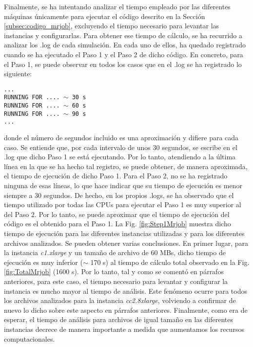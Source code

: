 \documentclass[10pt, spanish]{article}
\begin{document}
Finalmente, se ha intentando analizar el tiempo empleado por las diferentes máquinas únicamente para ejecutar el código descrito en la Sección \ref{subsec:codigo_mrjob}, excluyendo el tiempo necesario para levantar las instancias y configurarlas. Para obtener ese tiempo de cálculo, se ha recurrido a analizar los .log de cada simulación. En cada uno de ellos, ha quedado registrado cuando se ha ejecutado el Paso 1 y el Paso 2 de dicho código. En concreto, para el Paso 1, se puede observar en todos los casos que en el .log se ha registrado lo siguiente:

\texttt{...} \\
\texttt{RUNNING FOR .... $\sim$ 30 s} \\
\texttt{RUNNING FOR .... $\sim$ 60 s} \\
\texttt{RUNNING FOR .... $\sim$ 90 s} \\
\texttt{...}

donde el número de segundos incluido es una aproximación y difiere para cada caso. Se entiende que, por cada intervalo de unos 30 segundos, se escribe en el .log que dicho Paso 1 se está ejecutando. Por lo tanto, atendiendo a la última línea en la que se ha hecho tal registro, se puede obtener, de manera aproximada, el tiempo de ejecución de dicho Paso 1. Para el Paso 2, no se ha registrado ninguna de esas líneas, lo que hace indicar que su tiempo de ejecución es menor siempre a 30 segundos. De hecho, en los propios .logs, se ha observado que el tiempo utilizado por todas las CPUs para ejecutar el Paso 1 es muy superior al del Paso 2. Por lo tanto, se puede aproximar que el tiempo de ejecución del código es el obtenido para el Paso 1. La Fig. \ref{fig:Step1Mrjob} muestra dicho tiempo de ejecución para las diferentes instancias utilizadas y para los diferentes archivos analizados. Se pueden obtener varias conclusiones. En primer lugar, para la instancia \textit{c1.xlarge} y un tamaño de archivo de 60 MBs, dicho tiempo de ejecución es muy inferior ($\sim$ 170 s) al tiempo de cálculo total observado en la Fig. \ref{fig:TotalMrjob} (1600 s). Por lo tanto, tal y como se comentó en párrafos anteriores, para este caso, el tiempo necesario para levantar y configurar la instancia es mucho mayor al tiempo de análisis. Este fenómeno ocurre para todos los archivos analizados para la instancia \textit{cc2.8xlarge}, volviendo a confirmar de nuevo lo dicho sobre este aspecto en párrafos anteriores. Finalmente, como era de esperar, el tiempo de análisis para archivos de igual tamaño en las diferentes instancias decrece de manera importante a medida que aumentamos los recursos computacionales. 
\end{document}
